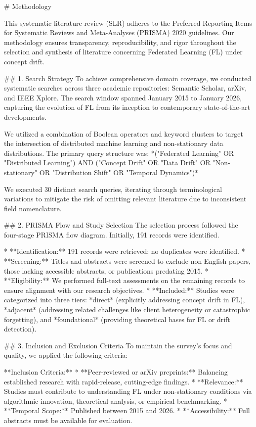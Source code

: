 \documentclass[journal]{IEEEtran}
\begin{document}
\# Methodology

This systematic literature review (SLR) adheres to the Preferred Reporting Items for Systematic Reviews and Meta-Analyses (PRISMA) 2020 guidelines. Our methodology ensures transparency, reproducibility, and rigor throughout the selection and synthesis of literature concerning Federated Learning (FL) under concept drift.

\#\# 1. Search Strategy
To achieve comprehensive domain coverage, we conducted systematic searches across three academic repositories: Semantic Scholar, arXiv, and IEEE Xplore. The search window spanned January 2015 to January 2026, capturing the evolution of FL from its inception to contemporary state-of-the-art developments.

We utilized a combination of Boolean operators and keyword clusters to target the intersection of distributed machine learning and non-stationary data distributions. The primary query structure was:
*("Federated Learning" OR "Distributed Learning") AND ("Concept Drift" OR "Data Drift" OR "Non-stationary" OR "Distribution Shift" OR "Temporal Dynamics")*

We executed 30 distinct search queries, iterating through terminological variations to mitigate the risk of omitting relevant literature due to inconsistent field nomenclature.

\#\# 2. PRISMA Flow and Study Selection
The selection process followed the four-stage PRISMA flow diagram. Initially, 191 records were identified.

*   **Identification:** 191 records were retrieved; no duplicates were identified.
*   **Screening:** Titles and abstracts were screened to exclude non-English papers, those lacking accessible abstracts, or publications predating 2015.
*   **Eligibility:** We performed full-text assessments on the remaining records to ensure alignment with our research objectives.
*   **Included:** Studies were categorized into three tiers: *direct* (explicitly addressing concept drift in FL), *adjacent* (addressing related challenges like client heterogeneity or catastrophic forgetting), and *foundational* (providing theoretical bases for FL or drift detection).

\#\# 3. Inclusion and Exclusion Criteria
To maintain the survey's focus and quality, we applied the following criteria:

**Inclusion Criteria:**
*   **Peer-reviewed or arXiv preprints:** Balancing established research with rapid-release, cutting-edge findings.
*   **Relevance:** Studies must contribute to understanding FL under non-stationary conditions via algorithmic innovation, theoretical analysis, or empirical benchmarking.
*   **Temporal Scope:** Published between 2015 and 2026.
*   **Accessibility:** Full abstracts must be available for evaluation.
\end{document}
